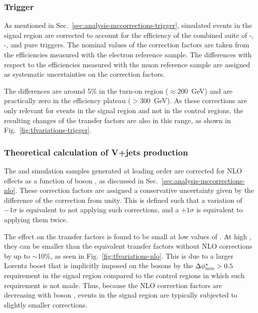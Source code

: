 \subsubsection{Trigger}
As mentioned in Sec.~\ref{sec:analysis-mccorrections-trigger}, simulated events 
in the signal region are corrected to account for the efficiency of the 
combined suite of \scalht-\alphat, \met-\mht, and pure \scalht triggers. The 
nominal values of the correction factors are taken from the efficiencies 
measured with the electron reference sample. The differences with respect to 
the efficiencies measured with the muon reference sample are assigned as 
systematic uncertainties on the correction factors. 

The differences are around 
5\% in the turn-on region (\mht$\approx200$~GeV) and are practically zero in 
the efficiency plateau (\mht$>300$~GeV). 
As these corrections are only relevant for events in the signal region and not 
in the control regions, the resulting changes of the transfer factors are also 
in this range, as shown in Fig.~\ref{fig:tfvariations-trigger}. 

\subsubsection{Theoretical calculation of V+jets production}
The \zj and \wj simulation samples generated at leading order are corrected for 
NLO effects as a function of boson \pt, as discussed in 
Sec.~\ref{sec:analysis-mccorrections-nlo}.
These correction factors are assigned a conservative uncertainty given by 
the difference of the correction from unity.
This is defined such that a variation of $-1\sigma$ 
is equivalent to not applying such corrections, and a $+1\sigma$ is equivalent 
to applying them twice.

The effect on the transfer factors is found to be small at low values of 
\scalht. At high \scalht, they can be smaller than the equivalent transfer 
factors without NLO corrections by up to $\sim$10\%, as seen in 
Fig.~\ref{fig:tfvariations-nlo}.
This is due to a larger Lorentz boost that is implicitly imposed 
on the bosons by the $\mbox{$\Delta\phi^{*}_{\mathrm{min}}$}>0.5$ requirement in the signal region compared to 
the control regions in which such requirement is not made. Thus, because the 
NLO correction factors are decreasing with boson \pt, events in the 
signal region are typically subjected to slightly smaller corrections.

